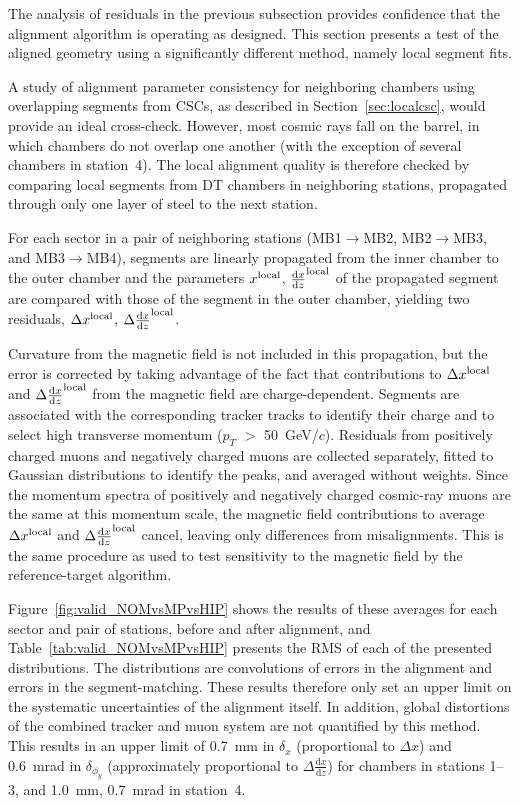 \documentclass[11pt,twoside,a4paper,cmspaper]{cms-tdr}
\begin{document}
The analysis of residuals in the previous subsection provides
confidence that the alignment algorithm is operating as designed.  This section
presents a test of the aligned geometry using a
significantly different method, namely local segment fits.

A study of alignment parameter consistency for neighboring chambers
using overlapping segments from CSCs, as described in
Section~\ref{sec:localcsc}, would provide an ideal cross-check.  However, most
cosmic rays fall on the barrel, in which chambers do not overlap one another (with the
exception of several chambers in station~4).  The local alignment quality is
therefore checked by comparing local segments from DT chambers in neighboring stations,
propagated through only one layer of steel to the next station.

For each sector in a pair of neighboring stations (MB1$\to$MB2,
MB2$\to$MB3, and MB3$\to$MB4), segments are linearly propagated from the
inner chamber to the outer chamber and the parameters $x^{\mbox{\scriptsize local}}$,
${\frac{\textrm{d}x}{\textrm{d}z}}^{\mbox{\scriptsize local}}$ of the
propagated segment are compared with those of the segment in the outer chamber,
yielding two residuals, $\Delta x^{\mbox{\scriptsize local}}$,
$\Delta {\frac{\textrm{d}x}{\textrm{d}z}}^{\mbox{\scriptsize local}}$.

Curvature from the magnetic field is not included in this propagation,
but the error is corrected by taking advantage of the fact that
contributions to $\Delta x^{\mbox{\scriptsize local}}$ and $\Delta
{\frac{\textrm{d}x}{\textrm{d}z}}^{\mbox{\scriptsize local}}$ from the magnetic field
are charge-dependent.  Segments are associated with the corresponding
tracker tracks to identify their charge and to select high transverse momentum
($p_T$ $>$ 50~GeV/$c$).  Residuals from positively charged muons and
negatively charged muons are collected separately, fitted to Gaussian
distributions to identify the peaks, and averaged without weights.
Since the momentum spectra of positively and negatively charged
cosmic-ray muons are the same at this momentum scale, the magnetic
field contributions to average $\Delta x^{\mbox{\scriptsize local}}$
and $\Delta {\frac{\textrm{d}x}{\textrm{d}z}}^{\mbox{\scriptsize local}}$ cancel,
leaving only differences from misalignments.  This is the same
procedure as used to test sensitivity to the magnetic field by the
reference-target algorithm.

Figure~\ref{fig:valid_NOMvsMPvsHIP} shows the results of these
averages for each sector and pair of stations, before and after
alignment, and Table~\ref{tab:valid_NOMvsMPvsHIP} presents the RMS of
each of the presented distributions.  The distributions are convolutions of
errors in the alignment and errors in the segment-matching.  These results
therefore only set an upper limit on the
systematic uncertainties of the alignment itself.  In addition, global
distortions of the combined tracker and muon system are not quantified
by this method.  This results in an upper limit of 0.7~mm in
$\delta_x$ (proportional to $\Delta x$) and 0.6~mrad in
$\delta_{\phi_y}$ (approximately proportional to
$\Delta \frac{\textrm{d}x}{\textrm{d}z}$) for chambers in stations 1--3, and 1.0~mm,
0.7~mrad in station~4.
\end{document}
